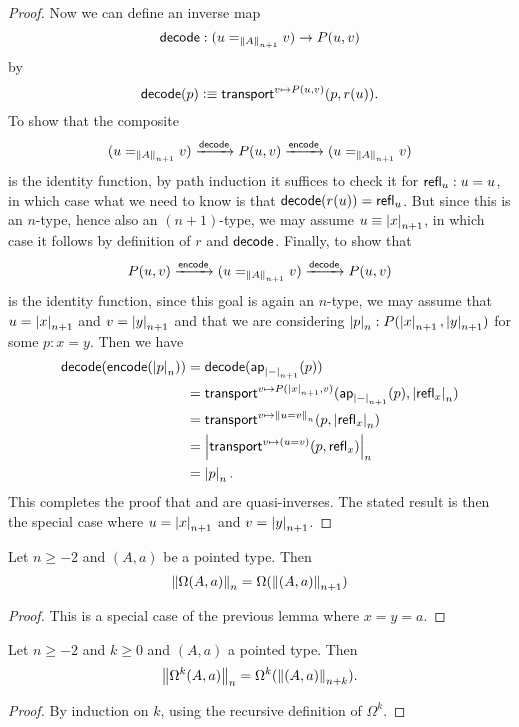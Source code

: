 \begin{proof}
  Now we can define an inverse map
  \[\decode: (u=_{\trunc{n+1}A}v) \to P(u,v)\]
  by
  \[\decode(p) \defeq \transfib{v\mapsto P(u,v)}{p}{r(u)}. \]
  To show that the composite
  \[ (u=_{\trunc{n+1}A}v) \xrightarrow{\decode} P(u,v) \xrightarrow{\encode} (u=_{\trunc{n+1}A}v) \]
  is the identity function, by path induction it suffices to check it for $\refl u : u=u$, in which case what we need to know is that
$\decode(r(u)) = \refl{u}$.
  But since this is an $n$-type, hence also an $(n+1)$-type, we may assume $u\jdeq \tproj {n+1} x$, in which case it follows by definition
of $r$ and $\decode$.
  Finally, to show that 
  \[ P(u,v) \xrightarrow{\encode} (u=_{\trunc{n+1}A}v) \xrightarrow{\decode} P(u,v) \]
  is the identity function, since this goal is again an $n$-type, we may assume that $u=\tproj {n+1}x$ and $v=\tproj {n+1}y$ and that we are
considering $\tproj n p:P(\tproj{n+1}x,\tproj{n+1}y)$ for some $p:x=y$.
  Then we have
  \begin{align*}
    \decode(\encode(\tproj n p)) &= \decode(\apfunc{\tproj{n+1}-}(p))\\
    &= \transfib{v\mapsto P(\tproj{n+1}x,v)}{\apfunc{\tproj{n+1}-}(p)}{\tproj n {\refl x}}\\
    &= \transfib{v\mapsto \trunc n{u=v}}{p}{\tproj n {\refl x}}\\
    &= \tproj n {\transfib{v \mapsto (u=v)}{p}{\refl x}}\\
    &= \tproj n p.
  \end{align*}
  This completes the proof that \encode and \decode are quasi-inverses.
  The stated result is then the special case where $u=\tproj {n+1}x$ and $v=\tproj {n+1}y$.
\end{proof}

\begin{cor}
  Let $n\ge-2$ and $(A,a)$ be a pointed type. Then
  \[\trunc n{\Omega(A,a)}=\Omega(\trunc{n+1}{(A,a)})\]
\end{cor}
\begin{proof}
  This is a special case of the previous lemma where $x=y=a$.
\end{proof}

\begin{cor}
  Let $n\ge -2$ and $k\ge 0$ and $(A,a)$ a pointed type.  Then
  \[\trunc n{\Omega^k(A,a)} = \Omega^k(\trunc{n+k}{(A,a)}). \]
\end{cor}
\begin{proof}
  By induction on $k$, using the recursive definition of $\Omega^k$.
\end{proof}

